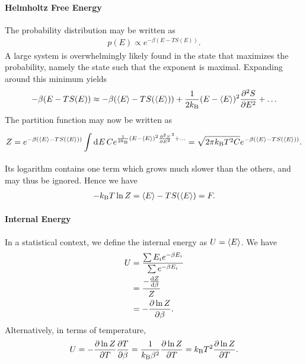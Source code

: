 \paragraph{Helmholtz Free Energy}
The probability distribution may be written as
\begin{align*}
	p(E) \propto e^{-\beta(E - TS(E))}.
\end{align*}
A large system is overwhelmingly likely found in the state that maximizes the probability, namely the state such that the exponent is maximal. Expanding around this minimum yields
\begin{align*}
	-\beta(E - TS(E)) \approx -\beta(\expval{E} - TS(\expval{E})) + \frac{1}{2k_{\text{B}}}(E - \expval{E})^{2}\pdv[2]{S}{E} + \dots
\end{align*}
The partition function may now be written as
\begin{align*}
	Z = e^{-\beta(\expval{E} - TS(\expval{E}))}\int\limits_{}^{}\dd[]{E}Ce^{\frac{1}{2k_{\text{B}}}(E - \expval{E})^{2}\pdv[2]{S}{E}(E - \expval{E})^{2} + \dots} = \sqrt{2\pi k_{\text{B}} T^{2}C}e^{-\beta(\expval{E} - TS(\expval{E}))}.
\end{align*}
Its logarithm contains one term which grows much slower than the others, and may thus be ignored. Hence we have
\begin{align*}
	-k_{\text{B}} T\ln{Z} = \expval{E} - TS(\expval{E}) = F.
\end{align*}

\paragraph{Internal Energy}
In a statistical context, we define the internal energy as $U = \expval{E}$. We have
\begin{align*}
	U &= \frac{\sum E_{i}e^{-\beta E_{i}}}{\sum e^{-\beta E_{i}}} \\
	  &= \frac{-\dv{Z}{\beta}}{Z} \\
	  &= -\pdv{\ln{Z}}{\beta}.
\end{align*}
Alternatively, in terms of temperature,
\begin{align*}
	U = -\pdv{\ln{Z}}{T}\pdv{T}{\beta} = \frac{1}{k_{\text{B}}\beta^{2}}\pdv{\ln{Z}}{T} = k_{\text{B}} T^{2}\pdv{\ln{Z}}{T}.
\end{align*}

